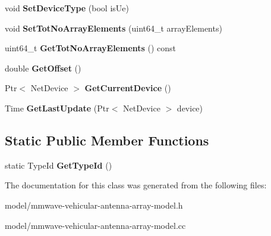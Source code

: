 \begin{DoxyCompactItemize}
void {\bfseries Set\+Device\+Type} (bool is\+Ue)
\item 
\mbox{\label{classns3_1_1millicar_1_1MmWaveVehicularAntennaArrayModel_aa570481367e2f3677f1ea4eedd37be40}} 
void {\bfseries Set\+Tot\+No\+Array\+Elements} (uint64\+\_\+t array\+Elements)
\item 
\mbox{\label{classns3_1_1millicar_1_1MmWaveVehicularAntennaArrayModel_a673379bcc08edd4e4a5087cc98bde535}} 
uint64\+\_\+t {\bfseries Get\+Tot\+No\+Array\+Elements} () const
\item 
\mbox{\label{classns3_1_1millicar_1_1MmWaveVehicularAntennaArrayModel_ab7fca5cec95fb67796031fa56d15f737}} 
double {\bfseries Get\+Offset} ()
\item 
\mbox{\label{classns3_1_1millicar_1_1MmWaveVehicularAntennaArrayModel_a92eee4f359b18cb6b5a7d472fe53dfe9}} 
Ptr$<$ Net\+Device $>$ {\bfseries Get\+Current\+Device} ()
\item 
\mbox{\label{classns3_1_1millicar_1_1MmWaveVehicularAntennaArrayModel_aa4665c98fbc53852782e954baf1e4919}} 
Time {\bfseries Get\+Last\+Update} (Ptr$<$ Net\+Device $>$ device)
\end{DoxyCompactItemize}
\subsection*{Static Public Member Functions}
\begin{DoxyCompactItemize}
\item 
\mbox{\label{classns3_1_1millicar_1_1MmWaveVehicularAntennaArrayModel_a450465ae8a280813c5d29d53a57cb590}} 
static Type\+Id {\bfseries Get\+Type\+Id} ()
\end{DoxyCompactItemize}


The documentation for this class was generated from the following files\+:\begin{DoxyCompactItemize}
\item 
model/mmwave-\/vehicular-\/antenna-\/array-\/model.\+h\item 
model/mmwave-\/vehicular-\/antenna-\/array-\/model.\+cc\end{DoxyCompactItemize}

